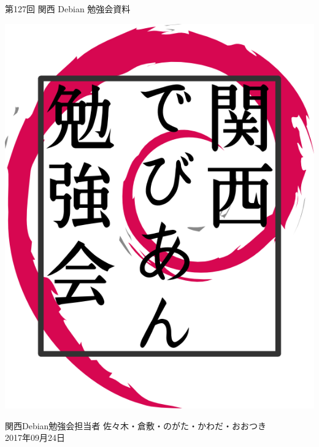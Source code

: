 \documentclass[mingoth,a4paper]{jsarticle}
\newcommand{\debmtgyear}{2017}
\newcommand{\debmtgdate}{24}
\newcommand{\debmtgmonth}{09}
\newcommand{\debmtgnumber}{127}
\begin{document}
\begin{titlepage}


  第\debmtgnumber{}回 関西 Debian 勉強会資料

  \vspace{2cm}

  \begin{center}
    \includegraphics{image200802/kansaidebianlogo.png}
  \end{center}

  \begin{flushright}
    \hfill{}関西Debian勉強会担当者 佐々木・倉敷・のがた・かわだ・おおつき \\
    \hfill{}\debmtgyear{}年\debmtgmonth{}月\debmtgdate{}日
  \end{flushright}

  \thispagestyle{empty}
\end{titlepage}

\end{document}
